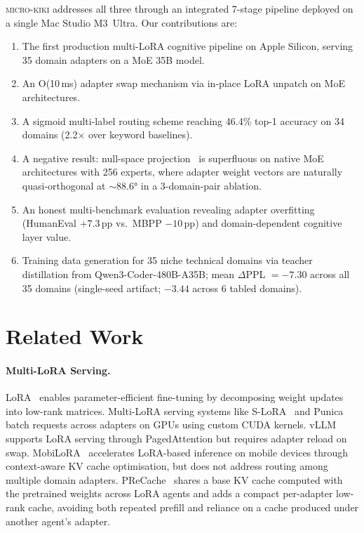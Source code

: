 \documentclass[11pt,a4paper]{article}
\begin{document}
\textsc{micro-kiki} addresses all three through an integrated 7-stage pipeline deployed on a single Mac Studio M3~Ultra. Our contributions are:
\begin{enumerate}[nosep]
  \item The first production multi-LoRA cognitive pipeline on Apple Silicon, serving 35 domain adapters on a MoE 35B model.
  \item An O(10\,ms) adapter swap mechanism via in-place LoRA unpatch on MoE architectures.
  \item A sigmoid multi-label routing scheme reaching 46.4\% top-1 accuracy on 34 domains (2.2$\times$ over keyword baselines).
  \item A negative result: null-space projection~\citep{abuayyash2026brainstacks} is superfluous on native MoE architectures with 256 experts, where adapter weight vectors are naturally quasi-orthogonal at ${\sim}88.6$° in a 3-domain-pair ablation.
  \item An honest multi-benchmark evaluation revealing adapter overfitting (HumanEval $+7.3$\,pp vs.\ MBPP $-10$\,pp) and domain-dependent cognitive layer value.
  \item Training data generation for 35 niche technical domains via teacher distillation from Qwen3-Coder-480B-A35B; mean $\Delta$PPL $= -7.30$ across all 35 domains (single-seed artifact; $-3.44$ across 6 tabled domains).
\end{enumerate}

\section{Related Work}
\label{sec:related}

\paragraph{Multi-LoRA Serving.}
LoRA~\citep{hu2022lora} enables parameter-efficient fine-tuning by decomposing weight updates into low-rank matrices. Multi-LoRA serving systems like S-LoRA~\citep{sheng2024slora} and Punica batch requests across adapters on GPUs using custom CUDA kernels. vLLM~\citep{kwon2023efficient} supports LoRA serving through PagedAttention but requires adapter reload on swap. MobiLoRA~\citep{mobilora2025} accelerates LoRA-based inference on mobile devices through context-aware KV cache optimisation, but does not address routing among multiple domain adapters. PReCache~\citep{jeon2026precache} shares a base KV cache computed with the pretrained weights across LoRA agents and adds a compact per-adapter low-rank cache, avoiding both repeated prefill and reliance on a cache produced under another agent's adapter.
\end{document}
